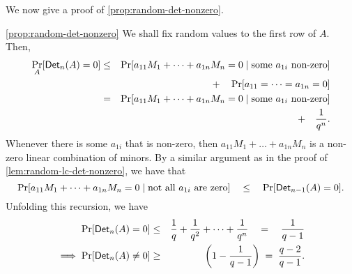 We now give a proof of \autoref{prop:random-det-nonzero}. 

\begin{proofof}{\autoref{prop:random-det-nonzero}}
We shall fix random values to the first row of $A$. Then,
\begin{eqnarray*}
\Pr_{A}[\mathsf{Det}_n(A) = 0] & \leq & \Pr[a_{11} M_1 + \dots + a_{1n} M_n = 0 \;|\;\text{some $a_{1i}$ non-zero}]\\
& &\quad + \quad \Pr[a_{11}=\dots = a_{1n} = 0]\\
 & = & \Pr[a_{11} M_1 + \dots + a_{1n} M_n = 0 \;|\;\text{some $a_{1i}$ non-zero}]\\
 & & \quad + \quad \frac{1}{q^n}.
\end{eqnarray*}
Whenever there is some $a_{1i}$ that is non-zero, then $a_{11}M_1 +
\dots + a_{1n}M_n$ is a non-zero linear combination of minors. By a
similar argument as in the proof of
\autoref{lem:random-lc-det-nonzero}, we have that
$$
\Pr[a_{11} M_1 + \dots + a_{1n}M_n = 0\;|\;\text{not all $a_{1i}$ are zero}] \quad \leq \quad \Pr[\mathsf{Det}_{n-1}(A) = 0].
$$
Unfolding this recursion, we have
\begin{eqnarray*}
\Pr[\mathsf{Det}_n(A) = 0] & \leq & \frac{1}{q} + \frac{1}{q^2} + \dots + \frac{1}{q^n} \quad=\quad \frac{1}{q-1}\\
\implies \Pr[\mathsf{Det}_n(A) \neq 0] & \geq & \left(1 - \frac{1}{q-1}\right) \;=\; \frac{q-2}{q-1}.
\end{eqnarray*}
\end{proofof}



